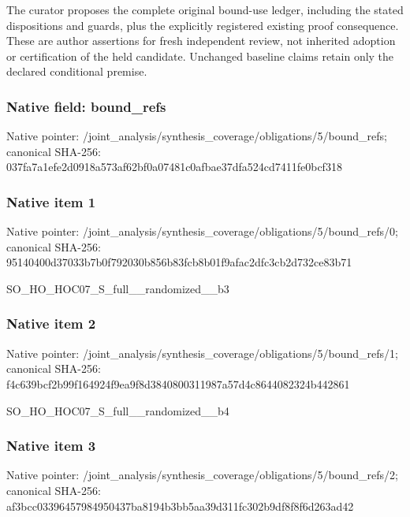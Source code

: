 \documentclass[10pt,a4paper]{article}
\begin{document}
\begingroup\raggedright\sloppy The curator proposes the complete original bound-use ledger,\allowbreak{} including the stated dispositions and guards,\allowbreak{} plus the explicitly registered existing proof consequence. These are author assertions for fresh independent review,\allowbreak{} not inherited adoption or certification of the held candidate. Unchanged baseline claims retain only the declared conditional premise.\par\endgroup

\subsubsection{Native field: bound\_\allowbreak{}refs}
Native pointer: /joint\_\allowbreak{}analysis/synthesis\_\allowbreak{}coverage/obligations/5/bound\_\allowbreak{}refs; canonical SHA-256: 037fa7a1efe2d0918a573af62bf0a07481c0afbae37dfa524cd7411fe0bcf318

\subsubsection{Native item 1}
Native pointer: /joint\_\allowbreak{}analysis/synthesis\_\allowbreak{}coverage/obligations/5/bound\_\allowbreak{}refs/0; canonical SHA-256: 95140400d37033b7b0f792030b856b83fcb8b01f9afac2dfc3cb2d732ce83b71

\begingroup\raggedright\sloppy SO\_\allowbreak{}HO\_\allowbreak{}HOC07\_\allowbreak{}S\_\allowbreak{}full\_\allowbreak{}\_\allowbreak{}randomized\_\allowbreak{}\_\allowbreak{}b3\par\endgroup

\subsubsection{Native item 2}
Native pointer: /joint\_\allowbreak{}analysis/synthesis\_\allowbreak{}coverage/obligations/5/bound\_\allowbreak{}refs/1; canonical SHA-256: f4c639bcf2b99f164924f9ea9f8d3840800311987a57d4c8644082324b442861

\begingroup\raggedright\sloppy SO\_\allowbreak{}HO\_\allowbreak{}HOC07\_\allowbreak{}S\_\allowbreak{}full\_\allowbreak{}\_\allowbreak{}randomized\_\allowbreak{}\_\allowbreak{}b4\par\endgroup

\subsubsection{Native item 3}
Native pointer: /joint\_\allowbreak{}analysis/synthesis\_\allowbreak{}coverage/obligations/5/bound\_\allowbreak{}refs/2; canonical SHA-256: af3bcc03396457984950437ba8194b3bb5aa39d311fc302b9df8f8f6d263ad42
\end{document}
